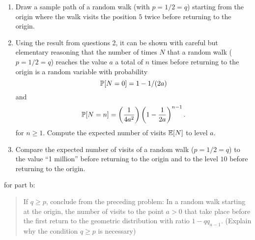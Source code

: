 \begin{problem}
  \begin{enumerate}
    \item Draw a sample path of a random walk (with $p = 1/2 = q$)
      starting from the
      origin where the walk visits the position $5$ twice before
      returning to the origin.
    \item Using the result from questions 2, it can be shown
      with careful but elementary reasoning that the number of times
      $N$ that a random
      walk ($p = 1/2 = q$) reaches the value $a$ a total of
      $n$ times before
      returning to the origin is a random variable with
      probability
      \[
           \P[N=0] = 1 - 1/(2a)
      \]
      and
      \[
          \P[N=n] = \left( \frac{1}{4a^2} \right) \left( 1 -
          \frac{1}{2a} \right)^{n-1}.
      \]
      for $n \ge 1$.
      Compute the
      expected number of visits $\E[N]$ to level $a$.
    \item Compare the expected number of visits of a random walk
      ($p= 1/2 = q$) to the value ``1 million'' before returning to
      the origin and to the level $10$ before returning to the origin.
  \end{enumerate}

\begin{sol}

for part b:
\begin{quote}
  If $q \ge p$, conclude from the preceding problem:  In a random
  walk starting at the origin, the number of visits to the point
  $a > 0$ that take place before the first return to the
  geometric distribution with ratio $1 - q q_{a-1}$.
  (Explain why the condition $q \ge p$ is necessary)
\end{quote}


\end{sol}
\end{problem}
